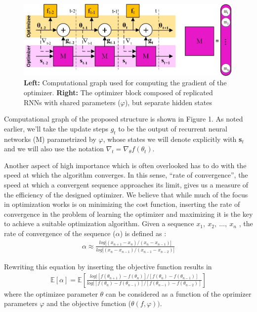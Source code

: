 \documentclass[a4paper, 11pt]{article}
\begin{document}
\begin{figure}[t]
	\centering
	\includegraphics{Fig1.jpg}
	\caption{\textbf{Left:} Computational graph used for computing the gradient of the optimizer. \textbf{Right:} The optimizer block composed of replicated RNNs with shared parameters ($\varphi$), but separate hidden states}
\end{figure}

Computational graph of the proposed structure is shown in Figure 1. As noted earlier, we'll take the update steps $g_t$ to be the output of  recurrent neural networks (M) parametrized by $\varphi$, whose states we will denote explicitly with \textbf{s$_t$} and we will also use the notation $\nabla_t=\nabla_\theta f(\theta_t)$. 

Another aspect of high importance which is often overlooked has to do with the speed at which the algorithm converges.  In this sense, \enquote{rate of convergence}, the speed at which a convergent sequence approaches its limit, gives us a measure of the efficiency of the designed optimizer. We believe that while much of the focus in optimization works is on minimizing the cost function, inserting the rate of convergence in the problem of learning the optimizer and maximizing it is the key to achieve a suitable optimization algorithm. 
Given a sequence $x_1,\ x_2,\ \ldots,\ x_n$ , the rate of convergence of the sequence ($\alpha$) is defined as \cite{schatzman2002numerical}:
\begin{eqnarray}
\alpha\approx\frac{log{|(x_{n+1}-x_n)/(x_n-x_{n-1})|}}{log{|(x_n-x_{n-1})/(x_{n-1}-x_{n-2})|}}
\end{eqnarray}

Rewriting this equation by inserting the objective function results in
\begin{eqnarray}
\mathbb{E}[\alpha]=\mathbb{E}\left[\frac{log|[f(\theta_{n+1})-f(\theta_n)]/[f(\theta_n)-f(\theta_{n-1})]}{log|[f(\theta_n)-f(\theta_{n-1})]/[f(\theta_{n-1})-f(\theta_{n-2})]}\right]
\end{eqnarray}
\noindent
where the optimizee parameter $\theta$ can be considered as a function of the oprimizer parameters $\varphi$ and the objective function ($\theta(f,\varphi)).$
\end{document}

